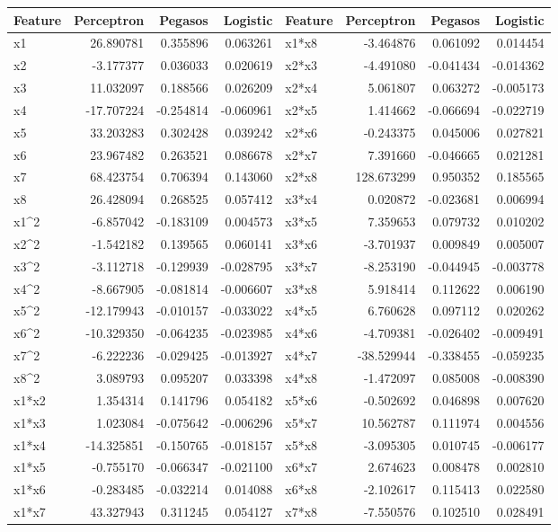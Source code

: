 \begin{tabular}{lrrrlrrr}
\toprule
Feature & Perceptron & Pegasos & Logistic & Feature & Perceptron & Pegasos & Logistic \\
\midrule
x1 & 26.890781 & 0.355896 & 0.063261 & x1*x8 & -3.464876 & 0.061092 & 0.014454 \\
x2 & -3.177377 & 0.036033 & 0.020619 & x2*x3 & -4.491080 & -0.041434 & -0.014362 \\
x3 & 11.032097 & 0.188566 & 0.026209 & x2*x4 & 5.061807 & 0.063272 & -0.005173 \\
x4 & -17.707224 & -0.254814 & -0.060961 & x2*x5 & 1.414662 & -0.066694 & -0.022719 \\
x5 & 33.203283 & 0.302428 & 0.039242 & x2*x6 & -0.243375 & 0.045006 & 0.027821 \\
x6 & 23.967482 & 0.263521 & 0.086678 & x2*x7 & 7.391660 & -0.046665 & 0.021281 \\
x7 & 68.423754 & 0.706394 & 0.143060 & x2*x8 & 128.673299 & 0.950352 & 0.185565 \\
x8 & 26.428094 & 0.268525 & 0.057412 & x3*x4 & 0.020872 & -0.023681 & 0.006994 \\
x1^2 & -6.857042 & -0.183109 & 0.004573 & x3*x5 & 7.359653 & 0.079732 & 0.010202 \\
x2^2 & -1.542182 & 0.139565 & 0.060141 & x3*x6 & -3.701937 & 0.009849 & 0.005007 \\
x3^2 & -3.112718 & -0.129939 & -0.028795 & x3*x7 & -8.253190 & -0.044945 & -0.003778 \\
x4^2 & -8.667905 & -0.081814 & -0.006607 & x3*x8 & 5.918414 & 0.112622 & 0.006190 \\
x5^2 & -12.179943 & -0.010157 & -0.033022 & x4*x5 & 6.760628 & 0.097112 & 0.020262 \\
x6^2 & -10.329350 & -0.064235 & -0.023985 & x4*x6 & -4.709381 & -0.026402 & -0.009491 \\
x7^2 & -6.222236 & -0.029425 & -0.013927 & x4*x7 & -38.529944 & -0.338455 & -0.059235 \\
x8^2 & 3.089793 & 0.095207 & 0.033398 & x4*x8 & -1.472097 & 0.085008 & -0.008390 \\
x1*x2 & 1.354314 & 0.141796 & 0.054182 & x5*x6 & -0.502692 & 0.046898 & 0.007620 \\
x1*x3 & 1.023084 & -0.075642 & -0.006296 & x5*x7 & 10.562787 & 0.111974 & 0.004556 \\
x1*x4 & -14.325851 & -0.150765 & -0.018157 & x5*x8 & -3.095305 & 0.010745 & -0.006177 \\
x1*x5 & -0.755170 & -0.066347 & -0.021100 & x6*x7 & 2.674623 & 0.008478 & 0.002810 \\
x1*x6 & -0.283485 & -0.032214 & 0.014088 & x6*x8 & -2.102617 & 0.115413 & 0.022580 \\
x1*x7 & 43.327943 & 0.311245 & 0.054127 & x7*x8 & -7.550576 & 0.102510 & 0.028491 \\
\bottomrule
\end{tabular}
